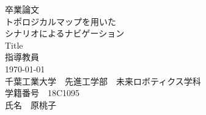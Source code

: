 \documentclass[../main]{subfiles}
\begin{document}
  \begin{titlepage}
    \begin{center}
      {\huge  卒業論文}\\
      \vspace{2cm}
      {\huge トポロジカルマップを用いた\\シナリオによるナビゲーション}\\
      \vspace{1cm}
      {\huge Title}\\
      \vspace{4cm}
      {\huge 指導教員}\\
      \vspace{2cm}
      {\LARGE \today}\\
      \vspace{1cm}
      {\LARGE 千葉工業大学　先進工学部　未来ロボティクス学科}\\
      \vspace{1cm}
      {\LARGE 学籍番号　18C1095}\\
      {\LARGE 氏名　原桃子}\\
    \end{center}
  \end{titlepage}
\end{document}
